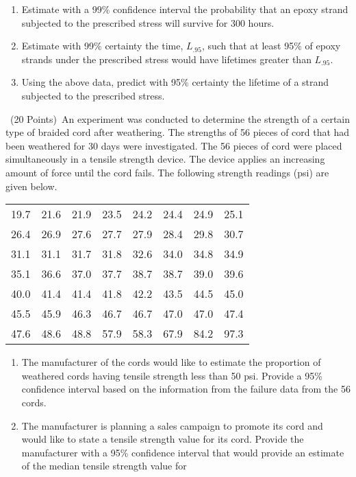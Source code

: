 \documentclass[10pt]{report}
\def\be{\begin{enumerate}}
\def\ee{\end{enumerate}}
\def\vvn{\vskip2mm\noindent}
\begin{document}
\begin{enumerate}
\item[(A)] Estimate with a 99\% confidence interval the probability that an epoxy strand
subjected to the prescribed stress will survive for 300 hours.
\item[(B)] Estimate with 99\% certainty the time, $L_{.95}$, such that at least 95\% of epoxy
strands under the prescribed  stress would have lifetimes greater than $L_{.95}$.
\item[(C)] Using the above data, predict with 95\% certainty the lifetime of  a strand subjected to the prescribed stress.
\ee
\vvn
\item[V.] \ (20 Points)\ An experiment was
conducted to determine the strength of a certain type of braided
cord after weathering. The strengths of 56 pieces of cord that had
been weathered for 30 days were investigated. The 56 pieces of
cord were placed simultaneously in a tensile strength device. The
device applies an increasing amount of force until the cord fails.
The following strength readings (psi) are given below.
\vvn\vvn
\begin{center}
\begin{tabular}{|cccccccc|}\hline
 19.7& 21.6& 21.9& 23.5& 24.2& 24.4& 24.9& 25.1\\
 26.4& 26.9& 27.6& 27.7& 27.9& 28.4& 29.8& 30.7\\
 31.1& 31.1& 31.7& 31.8& 32.6& 34.0& 34.8& 34.9\\
 35.1& 36.6& 37.0& 37.7& 38.7& 38.7& 39.0& 39.6\\
 40.0& 41.4& 41.4& 41.8& 42.2& 43.5& 44.5& 45.0\\
 45.5& 45.9& 46.3& 46.7& 46.7& 47.0& 47.0& 47.4\\
 47.6& 48.6& 48.8& 57.9& 58.3& 67.9& 84.2& 97.3\\
  \hline
\end{tabular}
\end{center}
\vvn
\be
\item[(A)] The manufacturer of the cords would
like to estimate  the
  proportion of weathered cords having tensile strength less than 50
  psi. Provide a 95\% confidence interval based on the information
  from the failure data from the 56 cords.
\item[(B)] The manufacturer is planning a sales campaign to
promote
  its cord and would like to state a tensile strength value for its
  cord. Provide the manufacturer with a 95\% confidence interval that
  would provide an estimate of the median tensile strength value for

\end{enumerate}
\end{document}
